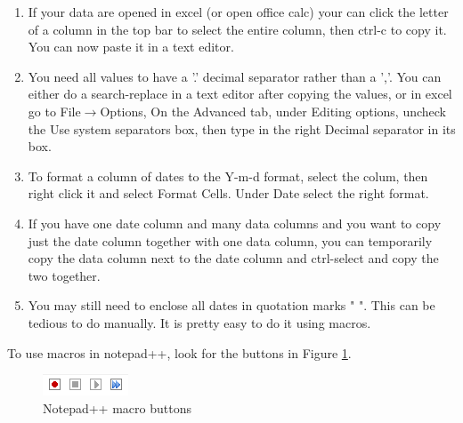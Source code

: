 \documentclass[11pt]{article}
\theoremstyle{definition}
\begin{document}
\begin{enumerate}[i]
\item If your data are opened in excel (or open office calc) your can click the letter of a column in the top bar to select the entire column, then ctrl-c to copy it. You can now paste it in a text editor.
\item You need all values to have a '.' decimal separator rather than a ','. You can either do a search-replace in a text editor after copying the values, or in excel go to File$\rightarrow$Options, On the Advanced tab, under Editing options, uncheck the Use system separators box, then type in the right Decimal separator in its box.
\item To format a column of dates to the Y-m-d format, select the colum, then right click it and select Format Cells. Under Date select the right format.
\item If you have one date column and many data columns and you want to copy just the date column together with one data column, you can temporarily copy the data column next to the date column and ctrl-select and copy the two together.
\item You may still need to enclose all dates in quotation marks " ". This can be tedious to do manually. It is pretty easy to do it using macros.
\end{enumerate}

To use macros in notepad++, look for the buttons in Figure \ref{fig:macro}.
\begin{figure}[H]
\centering
\includegraphics{notepadmacro}
\caption{Notepad++ macro buttons}\label{fig:macro}
\end{figure}
\end{document}
